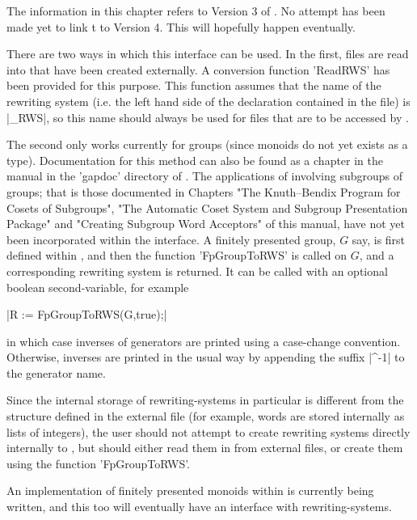 
The information in this chapter refers to Version 3 of {\GAP}.
No attempt has been made yet to link t{\KBMAG} to Version 4.
This will hopefully happen eventually.

There are two ways in which this interface can be used.
In the first, files are read into {\GAP} that have been created externally.
A {\GAP} conversion function 'ReadRWS' has been provided for this purpose.
This function assumes that the name of the rewriting system (i.e. the left
hand side of the declaration contained in the file) is |_RWS|, so this
name should always be used for files that are to be accessed by {\GAP}.

The second only works currently for groups (since monoids do not yet
exists as a {\GAP} type). Documentation for this method can also be found as
a chapter in the {\GAP} manual in the 'gapdoc' directory of {\KBMAG}.
The applications of {\KBMAG} involving subgroups of groups; that is those
documented in Chapters
"The Knuth--Bendix Program for Cosets of Subgroups",
"The Automatic Coset System and Subgroup Presentation Package" and
"Creating Subgroup Word Acceptors"
of this manual, have not yet been incorporated within the interface.
A finitely presented group, $G$ say, is first
defined within {\GAP}, and then the {\GAP} function 'FpGroupToRWS' is called
on $G$, and a corresponding rewriting system is returned.
It can be called with an optional boolean second-variable, for example

|R := FpGroupToRWS(G,true);|

in which case inverses of generators are
printed using a case-change convention. Otherwise, inverses are printed in
the usual way by appending the suffix |^-1| to the generator name.

Since the internal storage of rewriting-systems in particular is
different from the structure defined in the external file (for example,
words are stored internally as lists of integers), the user should not
attempt to create rewriting systems directly internally to {\GAP},
but should either read them in from external files, or create them using the
function 'FpGroupToRWS'.

An implementation of finitely presented monoids within {\GAP} is currently
being written, and this too will eventually have an interface with
rewriting-systems.
 
